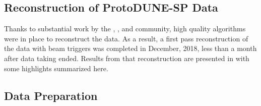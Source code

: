 \subsection{Reconstruction of ProtoDUNE-SP Data}
Thanks to substantial work by the , , and   community, high quality algorithms were in place to reconstruct the  data.  As a result, a first pass reconstruction of the  data with beam triggers was completed in December, 2018, less than a month after data taking ended.  Results from that reconstruction are presented in \physchtools %
with some highlights summarized here. 

\subsection{Data Preparation}

